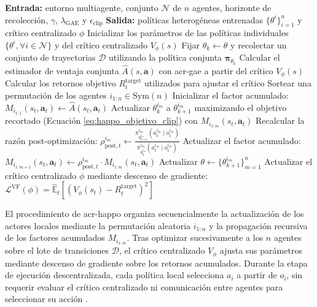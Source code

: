 \begin{algorithm}[H]
\caption{Algoritmo Heterogeneous-Agent Proximal Policy Optimization (\acrshort{acr-happo})}
\label{alg:happo}
\begin{algorithmic}[1]
\Statex \textbf{Entrada:} entorno multiagente, conjunto $\mathcal{N}$ de $n$ agentes, horizonte de recolección, $\gamma$, $\lambda_{\mathrm{GAE}}$ y $\epsilon_{\mathrm{clip}}$
\Statex \textbf{Salida:} políticas heterogéneas entrenadas $\{\theta^i\}_{i=1}^n$ y crítico centralizado $\phi$
\State Inicializar los parámetros de las políticas individuales $\{\theta^i, \forall i \in \mathcal{N}\}$ y del crítico centralizado $V_\phi(s)$
    \State Fijar $\theta_k \leftarrow \theta$ y recolectar un conjunto de trayectorias $\mathcal{D}$ utilizando la política conjunta $\boldsymbol{\pi}_{\theta_k}$
    \State Calcular el estimador de ventaja conjunta $\hat{A}(s, \mathbf{a})$ con \acrshort{acr-gae} a partir del crítico $V_\phi(s)$
    \State Calcular los retornos objetivo $R_t^{\text{target}}$ utilizados para ajustar el crítico
    \State Sortear una permutación de los agentes $i_{1:n} \in \text{Sym}(n)$
    \State Inicializar el factor acumulado: $M_{i_{1:1}}(s_t, \mathbf{a}_t) \leftarrow \hat{A}(s_t, \mathbf{a}_t)$
        \State Actualizar $\theta_k^{i_m}$ a $\theta_{k+1}^{i_m}$ maximizando el objetivo recortado (Ecuación \eqref{eq:happo_objetivo_clip}) con $M_{i_{1:m}}(s_t, \mathbf{a}_t)$
        \State Recalcular la razón post-optimización: $\rho_{\text{post},t}^{i_m} \leftarrow \frac{\pi_{\theta_{k+1}^{i_m}}^{i_m}(a_t^{i_m} \mid o_t^{i_m})}{\pi_{\theta_k^{i_m}}^{i_m}(a_t^{i_m} \mid o_t^{i_m})}$
            \State Actualizar el factor acumulado: $M_{i_{1:m+1}}(s_t, \mathbf{a}_t) \leftarrow \rho_{\text{post},t}^{i_m} \cdot M_{i_{1:m}}(s_t, \mathbf{a}_t)$
        \EndIf
    \EndFor
    \State Actualizar $\theta \leftarrow \{\theta_{k+1}^{i_m}\}_{m=1}^n$
    \State Actualizar el crítico centralizado $\phi$ mediante descenso de gradiente:
    \Statex $\mathcal{L}^{\text{VF}}(\phi) = \hat{\mathbb{E}}_t \left[ \left( V_\phi(s_t) - R_t^{\text{target}} \right)^2 \right]$
\EndFor
\end{algorithmic}
\end{algorithm}
El procedimiento de \acrshort{acr-happo} organiza secuencialmente la actualización de los actores locales mediante la permutación aleatoria $i_{1:n}$ y la propagación recursiva de los factores acumulados $M_{i_{1:m}}$. Tras optimizar sucesivamente a los $n$ agentes sobre el lote de transiciones $\mathcal{D}$, el crítico centralizado $V_\phi$ ajusta sus parámetros mediante descenso de gradiente sobre los retornos acumulados. Durante la etapa de ejecución descentralizada, cada política local selecciona $a_i$ a partir de $o_i$, sin requerir evaluar el crítico centralizado ni comunicación entre agentes para seleccionar su acción \cite{kuba2021trust}.

